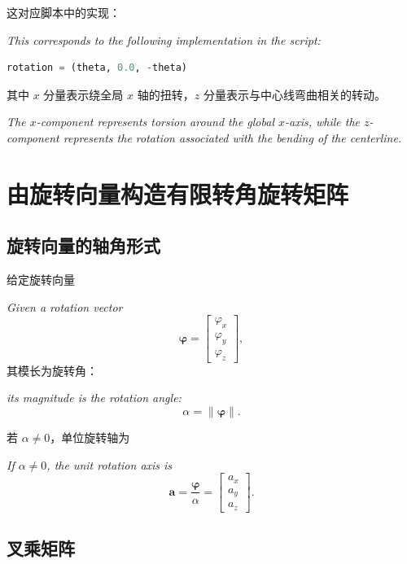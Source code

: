 \documentclass[UTF8,a4paper,11pt]{ctexart}
\begin{document}
这对应脚本中的实现：
\par\noindent\emph{This corresponds to the following implementation in the script:}
\begin{lstlisting}[language=Python]
rotation = (theta, 0.0, -theta)
\end{lstlisting}

其中 \(x\) 分量表示绕全局 \(x\) 轴的扭转，\(z\) 分量表示与中心线弯曲相关的转动。
\par\noindent\emph{The \(x\)-component represents torsion around the global \(x\)-axis, while the \(z\)-component represents the rotation associated with the bending of the centerline.}

\section{由旋转向量构造有限转角旋转矩阵}

\subsection{旋转向量的轴角形式}

给定旋转向量
\par\noindent\emph{Given a rotation vector}
\begin{equation}
  \bm{\varphi} =
  \begin{bmatrix}
    \varphi_x \\ \varphi_y \\ \varphi_z
  \end{bmatrix},
\end{equation}
其模长为旋转角：
\par\noindent\emph{its magnitude is the rotation angle:}
\begin{equation}
  \alpha = \|\bm{\varphi}\|.
\end{equation}

若 \(\alpha \neq 0\)，单位旋转轴为
\par\noindent\emph{If \(\alpha \neq 0\), the unit rotation axis is}
\begin{equation}
  \bm{a} =
  \frac{\bm{\varphi}}{\alpha}
  =
  \begin{bmatrix}
    a_x \\ a_y \\ a_z
  \end{bmatrix}.
\end{equation}

\subsection{叉乘矩阵}
\end{document}
